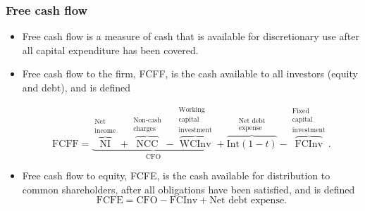 \documentclass[../notes_compiled.tex]{subfiles}
\begin{document}
\subsubsection{Free cash flow}
\begin{itemize}
\item Free cash flow is a measure of cash that is available for discretionary use after all capital expenditure has been covered.

\item Free cash flow to the firm, FCFF, is the cash available to all investors (equity and debt), and is defined

\begin{equation}
\mathrm{FCFF} = \underbrace{\overbrace{\mathrm{NI}}^{\substack{\text{Net} \\ \text{income}}} + \overbrace{\mathrm{NCC}}^{\substack{\text{Non-cash} \\ \text{charges}}} - \overbrace{\mathrm{WCInv}}^{\substack{\text{Working} \\ \text{capital} \\ \text{investment}}}}_{\mathrm{CFO}} + \overbrace{\text{Int}(1-t)}^{\substack{\text{Net debt} \\ \text{expense}}} - \overbrace{\mathrm{FCInv}}^{\substack{\text{Fixed} \\ \text{capital} \\ \text{investment}}}.
\end{equation}


\item Free cash flow to equity, FCFE, is the cash available for distribution to common shareholders, after all obligations have been satisfied, and is defined
\begin{equation}
\mathrm{FCFE} = \mathrm{CFO} - \mathrm{FCInv} + \text{Net debt expense}.
\end{equation}
\end{itemize}
\end{document}

